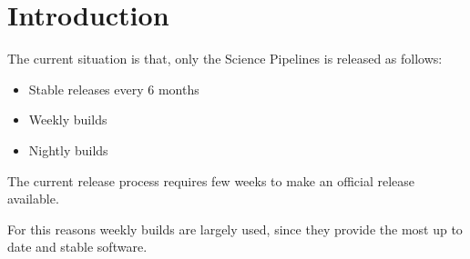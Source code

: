 \section{Introduction} \label{sec:intro}

The current situation is  that, only the Science Pipelines is released as follows:

\begin{itemize}
\item Stable releases every 6 months
\item Weekly builds
\item Nightly builds
\end{itemize}

The current release process requires few weeks to make an official release available.

For this reasons weekly builds are largely used, since they provide the most up to date and stable software.


